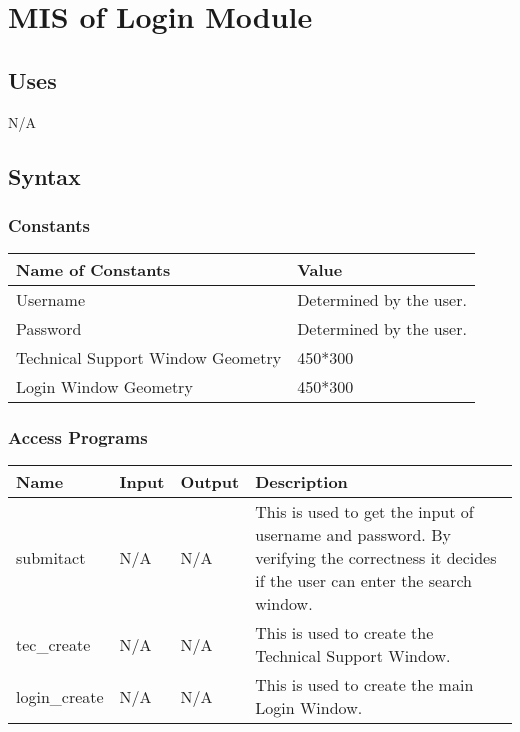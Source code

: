 \documentclass[12pt, titlepage]{article}
\begin{document}
\newpage

\section{MIS of Login Module} 



\subsection{Uses}
N/A

\subsection{Syntax}

\subsubsection{Constants}
\begin{center}
\begin{tabular}{|p{8cm}|p{6cm}|}
\hline
\textbf{Name of Constants} & \textbf{Value}\\
\hline
Username & Determined by the user.\\
\hline
Password & Determined by the user.\\
\hline
Technical Support Window Geometry & 450*300\\
\hline
Login Window Geometry & 450*300\\
\hline
\end{tabular}
\end{center}

\subsubsection{Access Programs}

\begin{center}
\begin{tabular}{|l|l|l| p{10cm} |}
\hline
\textbf{Name} & \textbf{Input} & \textbf{Output} & \textbf{Description}  \\
\hline
submitact & N/A & N/A & This is used to get the input of username and password. By verifying the correctness it decides if the user can enter the search window.\\
\hline
tec\_create & N/A & N/A & This is used to create the Technical Support Window.\\
\hline
login\_create & N/A & N/A & This is used to create the main Login Window.\\
\hline

\end{tabular}
\end{center}
\end{document}
